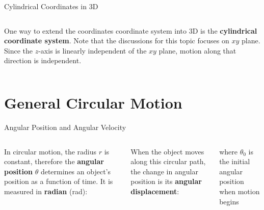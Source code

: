 \documentclass[12pt,compress,aspectratio=169]{beamer}
\begin{document}
\begin{frame}{Cylindrical Coordinates in 3D}
  \begin{columns}

    One way to extend the coordinates coordinate system into 3D is the
    \textbf{cylindrical coordinate system}. Note that the discussions for this
    topic focuses on $xy$ plane. Since the $z$-axis is linearly independent of
    the $xy$ plane, motion along that direction is independent.
  \end{columns}
\end{frame}



\section{General Circular Motion}

\begin{frame}{Angular Position and Angular Velocity}
  \vspace{.2in}
  \begin{columns}[T]
    
    
    In circular motion, the radius $r$ is constant, therefore the
    \textbf{angular position} $\theta$ determines an object's position as a
    function of time. It is measured in \textbf{radian} (\si{\radian}):


    \vspace{-.1in}When the object moves along this circular path, the change
    in angular position is its \textbf{angular displacement}:


    \vspace{-.1in}where $\theta_0$ is the initial angular position when motion
    begins
  \end{columns}
\end{frame}
\end{document}
